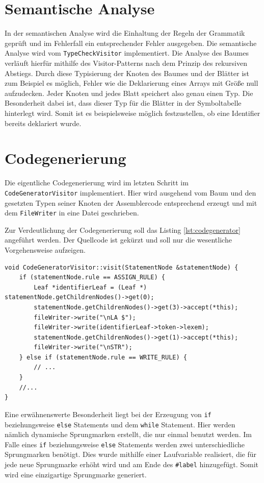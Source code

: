 \documentclass[a4paper,11pt]{report}
\begin{document}
\section{Semantische Analyse}
In der semantischen Analyse wird die Einhaltung der Regeln der Grammatik geprüft und im Fehlerfall ein entsprechender Fehler ausgegeben.
Die semantische Analyse wird vom \texttt{TypeCheckVisitor} implementiert.
Die Analyse des Baumes verläuft hierfür mithilfe des Visitor-Patterns nach dem Prinzip des rekursiven Abstiegs.
Durch diese Typisierung der Knoten des Baumes und der Blätter ist zum Beispiel es möglich, Fehler wie die Deklarierung eines Arrays mit Größe null aufzudecken.
Jeder Knoten und jedes Blatt speichert also genau einen Typ.
Die Besonderheit dabei ist, dass dieser Typ für die Blätter in der Symboltabelle hinterlegt wird.
Somit ist es beispielsweise möglich festzustellen, ob eine Identifier bereits deklariert wurde.

\section{Codegenerierung}
Die eigentliche Codegenerierung wird im letzten Schritt im \texttt{CodeGenerator\-Visitor} implementiert.
Hier wird ausgehend vom Baum und den gesetzten Typen seiner Knoten der Assemblercode entsprechend erzeugt und mit dem \texttt{FileWriter} in eine Datei geschrieben.

Zur Verdeutlichung der Codegenerierung soll das Listing \ref{lst:codegenerator} angeführt werden.
Der Quellcode ist gekürzt und soll nur die wesentliche Vorgehensweise aufzeigen.

\begin{lstlisting}[caption=Codegenerierung, label=lst:codegenerator]
void CodeGeneratorVisitor::visit(StatementNode &statementNode) {
	if (statementNode.rule == ASSIGN_RULE) {
		Leaf *identifierLeaf = (Leaf *) statementNode.getChildrenNodes()->get(0);
		statementNode.getChildrenNodes()->get(3)->accept(*this);
		fileWriter->write("\nLA $");
		fileWriter->write(identifierLeaf->token->lexem);
		statementNode.getChildrenNodes()->get(1)->accept(*this);
		fileWriter->write("\nSTR");
	} else if (statementNode.rule == WRITE_RULE) {
		// ...
	}
	//...
}
\end{lstlisting}

Eine erwähnenswerte Besonderheit liegt bei der Erzeugung von \texttt{if} beziehungsweise \texttt{else} Statements und dem \texttt{while} Statement.
Hier werden nämlich dynamische Sprungmarken erstellt, die nur einmal benutzt werden.
Im Falle eines \texttt{if} beziehungsweise \texttt{else} Statements werden zwei unterschiedliche Sprungmarken benötigt.
Dies wurde mithilfe einer Laufvariable realisiert, die für jede neue Sprungmarke erhöht wird und am Ende des \texttt{\#label} hinzugefügt.
Somit wird eine einzigartige Sprungmarke generiert.
\end{document}
